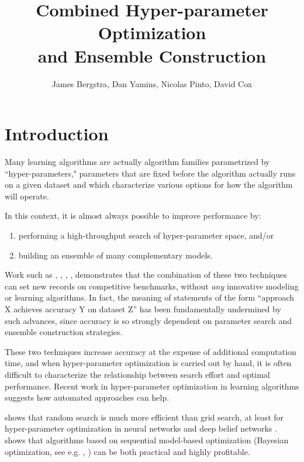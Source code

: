 \documentclass[11pt,twocolumn]{article}
\title{Combined Hyper-parameter Optimization\\and Ensemble Construction}
\author{James Bergstra, Dan Yamins, Nicolas Pinto, David Cox}
\begin{document}
\maketitle


\section{Introduction}

Many learning algorithms are actually algorithm families parametrized by 
``hyper-parameters,"  parameters that are fixed before the algorithm 
actually runs on a given dataset and which characterize various options for how
the algorithm will operate.

\vspace{11pt}
In this context, it is almost always possible to improve performance 
by:
\begin{enumerate}
 \item performing a high-throughput search of hyper-parameter space, and/or
 \item building an ensemble of many complementary models.
\end{enumerate}

\vspace{11pt}
Work such as
\citet{plos_ht}, \citet{fg11}, \citet{coates+lee+ng:2010},
\citet{gehler}, \citet{bergstra+bardenet+bengio+kegl:2011}
demonstrates that the combination of these two techniques can set new
records on competitive benchmarks, without \emph{any} innovative modeling or
learning algorithms.  In fact, the meaning of statements of the form
``approach X achieves accuracy Y on dataset Z'' has been fundamentally undermined by such
advances, since accuracy is so strongly dependent on parameter search and
ensemble construction strategies.

\vspace{11pt}
These two techniques increase accuracy at the expense of 
additional computation time, and when hyper-parameter 
optimization is carried out by hand, it is often
difficult to characterize the relationship between search 
effort and optimal performance.  Recent work in hyper-parameter
optimization in learning algorithms suggests how automated approaches
can help.

\vspace{11pt}
\citet{bergstra+bengio:2012} shows that random search is much more
efficient than grid search, at least for hyper-parameter optimization in
neural networks and deep belief networks
\citep{hinton+osinero+teh:2006}.
\citet{bergstra+bardenet+bengio+kegl:2011} shows that algorithms based on
sequential model-based optimization (Bayesian optimization,
see e.g. \citep{hutter:2006}, \citet{brochu:2008})
can be both practical and highly profitable.
\end{document}
